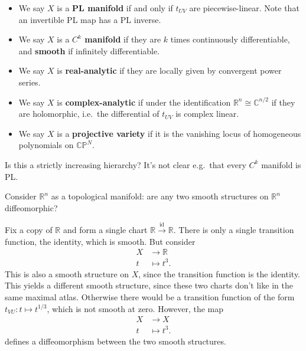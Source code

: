 \begin{definition}

\envlist

\begin{itemize}
\item
  We say \(X\) is a \textbf{PL manifold} if and only if \(t_{UV}\) are
  piecewise-linear. Note that an invertible PL map has a PL inverse.
\item
  We say \(X\) is a \textbf{\(C^k\) manifold} if they are \(k\) times
  continuously differentiable, and \textbf{smooth} if infinitely
  differentiable.
\item
  We say \(X\) is \textbf{real-analytic} if they are locally given by
  convergent power series.
\item
  We say \(X\) is \textbf{complex-analytic} if under the identification
  \({\mathbb{R}}^n \cong {\mathbb{C}}^{n/2}\) if they are holomorphic,
  i.e.~the differential of \(t_{UV}\) is complex linear.
\item
  We say \(X\) is a \textbf{projective variety} if it is the vanishing
  locus of homogeneous polynomials on \({\mathbb{CP}}^N\).
\end{itemize}

\end{definition}

\begin{remark}

Is this a strictly increasing hierarchy? It's not clear e.g.~that every
\(C^k\) manifold is PL.

\end{remark}

\begin{question}

Consider \({\mathbb{R}}^n\) as a topological manifold: are any two
smooth structures on \({\mathbb{R}}^n\) diffeomorphic?

\end{question}

\begin{remark}

Fix a copy of \({\mathbb{R}}\) and form a single chart
\({\mathbb{R}}\xrightarrow{\operatorname{id}} {\mathbb{R}}\). There is
only a single transition function, the identity, which is smooth. But
consider
\begin{align*}
X &\to {\mathbb{R}}\\
t &\mapsto t^3
.\end{align*}
This is also a smooth structure on \(X\), since the transition function
is the identity. This yields a different smooth structure, since these
two charts don't like in the same maximal atlas. Otherwise there would
be a transition function of the form \(t_{VU}: t\mapsto t^{1/3}\), which
is not smooth at zero. However, the map
\begin{align*}
X &\to X \\
t &\mapsto t^3
.\end{align*}
defines a diffeomorphism between the two smooth structures.

\end{remark}

